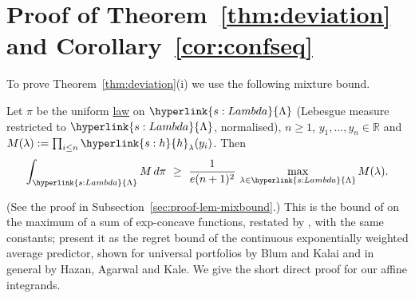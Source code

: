 \documentclass[11pt]{article}
\newcommand{\R}{\mathbb{R}}
\newcommand{\sy}[2]{{\hyperlink{#1}{#2}}}
\newcommand{\term}[2]{\hyperlink{#1}{#2}}
\newcommand{\hl}{\sy{s:h}{h}}
\newcommand{\Lam}{\sy{s:Lambda}{\Lambda}}
\begin{document}
\section{\texorpdfstring{Proof of Theorem~\ref{thm:deviation} and Corollary~\ref{cor:confseq}}{Proof of Theorem 7.1 and Corollary 7.2}}\label{sec:proof-deviation}

To prove Theorem~\ref{thm:deviation}(i) we use the following mixture bound.

\begin{lemma}\label{lem:mixbound}
Let $\pi$ be the uniform \term{w:law}{law} on $\Lam$ (Lebesgue measure restricted to $\Lam$, normalised), $n\ge1$,
$y_1,\dots,y_n\in\R$ and $M(\lambda):=\prod_{i\le n}\hl_\lambda(y_i)$. Then
\begin{equation*}
  \int_\Lam M\,d\pi\ \ge\ \frac{1}{e(n+1)^2}\,\max_{\lambda\in\Lam}M(\lambda).
\end{equation*}
\end{lemma}

(See the proof in Subsection~\ref{sec:proof-lem-mixbound}.) This is the bound of \citet[Lemma~E.1 of the arXiv
version]{AKJ21} on the maximum of a sum of exp-concave functions, restated by \citet[Lemma~11]{AJK21}, with the
same constants; \citet{AKJ21} present it as the regret bound of the continuous exponentially weighted average
predictor, shown for universal portfolios by Blum and Kalai and in general by Hazan, Agarwal and Kale. We give
the short direct proof for our affine integrands.
\end{document}

